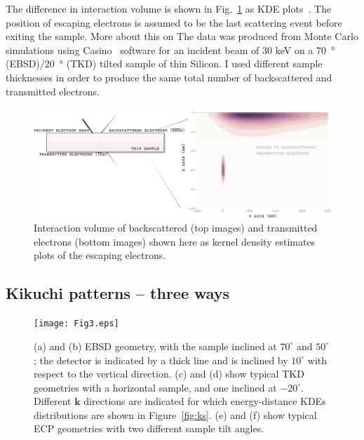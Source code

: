 The difference in interaction volume is shown in Fig.~\ref{fig:intvolume} as KDE plots~\cite{KDE}. The position of escaping electrons is assumed to be the last scattering event before exiting the sample. More about this on The data was produced from Monte Carlo simulations using Casino~\cite{casino} software for an incident beam of 30 keV on a \SI{70}{\degree} (EBSD)/\SI{20}{\degree} (TKD) tilted sample of thin Silicon. I used different sample thicknesses in order to produce the same total number of backscattered and transmitted electrons.

\begin{figure}[ht]
\centering
\includegraphics[width=1.1\linewidth]{Figures/TKDpendepth.png}
\caption[Interaction volume]{Interaction volume of backscattered (top images) and transmitted electrons (bottom images) shown here as kernel density estimates plots of the escaping electrons.}
\label{fig:intvolume}
\end{figure}



\subsection{Kikuchi patterns -- three ways}
\label{sec:Kikuchi}



\begin{figure}[ht]
\centering\leavevmode
\texttt{[image: Fig3.eps]}%
\caption[EBSD, TKD and ECP set up geometry.]{(a) and (b) EBSD geometry, with the sample inclined at $70^{\circ}$ and $50^{\circ}$; the detector is indicated by a thick line and is inclined by $10^{\circ}$ with respect to the vertical direction. (c) and (d) show typical TKD geometries with a horizontal sample, and one inclined at $-20^{\circ}$.  Different $\mathbf{k}$ directions are indicated for which energy-distance KDEs distributions are shown in Figure~\ref{fig:ks}. (e) and (f) show typical ECP geometries with two different sample tilt angles.}
\label{fig:geometries}
\end{figure}



